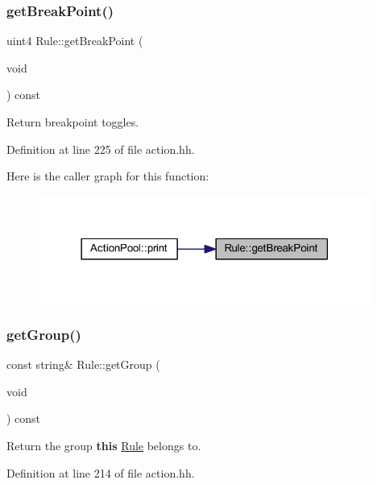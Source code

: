 \subsubsection{\texorpdfstring{getBreakPoint()}{getBreakPoint()}}
{\footnotesize\ttfamily uint4 Rule\+::get\+Break\+Point (\begin{DoxyParamCaption}\item[{void}]{ }\end{DoxyParamCaption}) const\hspace{0.3cm}{\ttfamily [inline]}}



Return breakpoint toggles. 



Definition at line 225 of file action.\+hh.

Here is the caller graph for this function\+:
\nopagebreak
\begin{figure}[H]
\begin{center}
\leavevmode
\includegraphics[width=309pt]{class_rule_ab3051cfc2bf2286c91023a9f647c86b9_icgraph}
\end{center}
\end{figure}
\mbox{\label{class_rule_a2192026b8e90d56922a150e099783cd5}} 
\subsubsection{\texorpdfstring{getGroup()}{getGroup()}}
{\footnotesize\ttfamily const string\& Rule\+::get\+Group (\begin{DoxyParamCaption}\item[{void}]{ }\end{DoxyParamCaption}) const\hspace{0.3cm}{\ttfamily [inline]}}



Return the group {\bfseries{this}} \mbox{\hyperlink{class_rule}{Rule}} belongs to. 



Definition at line 214 of file action.\+hh.

